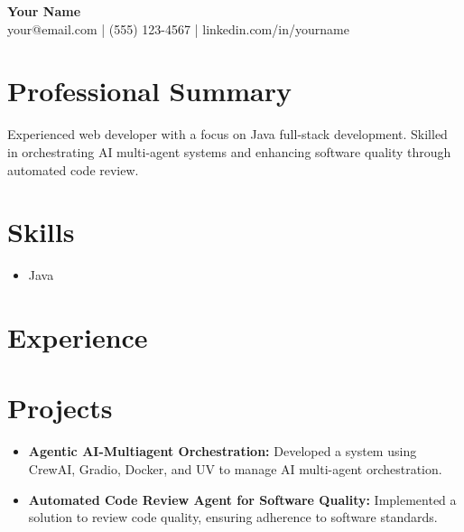 \documentclass[11pt,a4paper]{article}
\begin{document}
\begin{center}
{\LARGE \textbf{Your Name}} \\[4pt]
your@email.com \quad | \quad (555) 123-4567 \quad | \quad linkedin.com/in/yourname
\end{center}

\vspace{8pt}

\section*{Professional Summary}
Experienced web developer with a focus on Java full-stack development. Skilled in orchestrating AI multi-agent systems and enhancing software quality through automated code review.

\section*{Skills}
\begin{itemize}
\item Java
\end{itemize}

\section*{Experience}

\section*{Projects}
\begin{itemize}
\item \textbf{Agentic AI-Multiagent Orchestration:} Developed a system using CrewAI, Gradio, Docker, and UV to manage AI multi-agent orchestration.
\item \textbf{Automated Code Review Agent for Software Quality:} Implemented a solution to review code quality, ensuring adherence to software standards.
\end{itemize}
\end{document}
